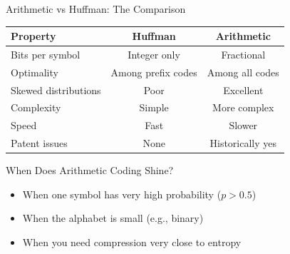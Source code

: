 \documentclass[aspectratio=169,12pt]{beamer}
\begin{document}
\begin{frame}{Arithmetic vs Huffman: The Comparison}
    \begin{center}
        \begin{tabular}{l|c|c}
            \toprule
            \textbf{Property} & \textbf{Huffman} & \textbf{Arithmetic} \\
            \midrule
            Bits per symbol & Integer only & Fractional \\
            Optimality & Among prefix codes & Among all codes \\
            Skewed distributions & Poor & Excellent \\
            Complexity & Simple & More complex \\
            Speed & Fast & Slower \\
            Patent issues & None & Historically yes \\
            \bottomrule
        \end{tabular}
    \end{center}
    
    \vspace{0.5cm}
    \begin{block}{When Does Arithmetic Coding Shine?}
        \begin{itemize}
            \item When one symbol has very high probability ($p > 0.5$)
            \item When the alphabet is small (e.g., binary)
            \item When you need compression very close to entropy
        \end{itemize}
    \end{block}
\end{frame}
\end{document}
